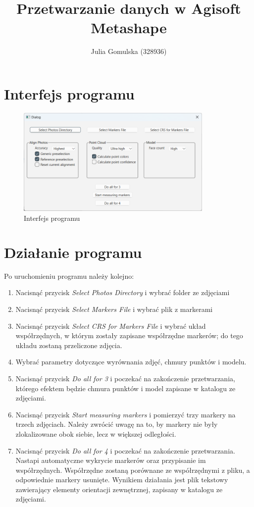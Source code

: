 \documentclass{article}
\title{Przetwarzanie danych w Agisoft Metashape}
\author{Julia Gomulska (328936)}
\begin{document}
\maketitle

\section{Interfejs programu}

\begin{figure}[H]
    \centering
    \includegraphics[width=0.85\textwidth]{Interfejs.png}
    \caption{Interfejs programu}
\end{figure}

\section{Działanie programu}

Po uruchomieniu programu należy kolejno:
\begin{enumerate}
    \item Nacisnąć przycisk \textit{Select Photos Directory} i wybrać folder ze zdjęciami
    \item Nacisnąć przycisk \textit{Select Markers File} i wybrać plik z markerami
    \item Nacisnąć przycisk \textit{Select CRS for Markers File} i wybrać układ współrzędnych, w którym zostały zapisane współrzędne markerów; do tego układu zostaną przeliczone zdjęcia.
    \item Wybrać parametry dotyczące wyrównania zdjęć, chmury punktów i modelu.
    \item Nacisnąć przycisk \textit{Do all for 3} i poczekać na zakończenie przetwarzania, którego efektem będzie chmura punktów i model zapisane w katalogu ze zdjęciami.
    \item Nacisnąć przycisk \textit{Start measuring markers} i pomierzyć trzy markery na trzech zdjęciach. Należy zwrócić uwagę na to, by markery nie były zlokalizowane obok siebie, lecz w większej odległości.
    \item Nacisnąć przycisk \textit{Do all for 4  } i poczekać na zakończenie przetwarzania. Nastapi automatyczne wykrycie markerów oraz przypisanie im współrzędnych.
    Współrzędne zostaną porównane ze współrzędnymi z pliku, a odpowiednie markery usunięte. Wynikiem działania jest plik tekstowy zawierający elementy orientacji zewnętrznej,
    zapisany w katalogu ze zdjęciami.
\end{enumerate}
\end{document}
